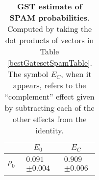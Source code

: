 \documentclass{article}[11pt]
\begin{document}
\begin{table}[h]
\begin{center}
\begin{tabular}[l]{|c|c|c|}
\hline
 & $E_{0}$ & $E_C$ \\ \hline
$\rho_{0}$ & $ \begin{array}{c} 0.091 \\ \pm 0.004 \end{array} $ & $ \begin{array}{c} 0.909 \\ \pm 0.006 \end{array} $ \\ \hline
\end{tabular}

\caption{\textbf{GST estimate of SPAM probabilities}.  Computed by taking the dot products of vectors in Table \ref{bestGatesetSpamTable}.  The symbol $E_C$, when it appears, refers to the ``complement'' effect given by subtracting each of the other effects from the identity.\label{bestGatesetSpamParametersTable}}
\end{center}
\end{table}
\end{document}
